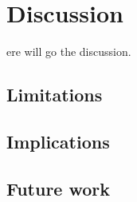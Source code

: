 %
%
\let\textcircled=\pgftextcircled
\chapter{Discussion}
\label{chap:dis}
ere will go the discussion.

\section{Limitations}
\section{Implications}
\section{Future work}